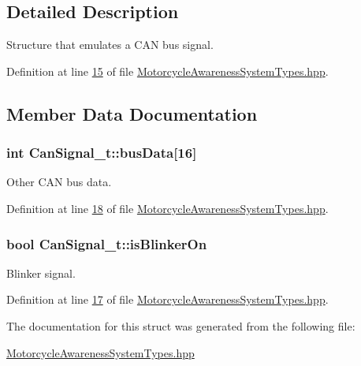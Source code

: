 \subsection{Detailed Description}
Structure that emulates a C\-A\-N bus signal. 

Definition at line \hyperlink{MotorcycleAwarenessSystemTypes_8hpp_source_l00015}{15} of file \hyperlink{MotorcycleAwarenessSystemTypes_8hpp_source}{Motorcycle\-Awareness\-System\-Types.\-hpp}.



\subsection{Member Data Documentation}
\hypertarget{structCanSignal__t_a460bece1b65aa03b07f986c71f818456}{
\subsubsection[{bus\-Data}]{\setlength{\rightskip}{0pt plus 5cm}int Can\-Signal\-\_\-t\-::bus\-Data\mbox{[}16\mbox{]}}}\label{structCanSignal__t_a460bece1b65aa03b07f986c71f818456}


Other C\-A\-N bus data. 



Definition at line \hyperlink{MotorcycleAwarenessSystemTypes_8hpp_source_l00018}{18} of file \hyperlink{MotorcycleAwarenessSystemTypes_8hpp_source}{Motorcycle\-Awareness\-System\-Types.\-hpp}.

\hypertarget{structCanSignal__t_a209edc6387534529f57c2362ec8f2586}{
\subsubsection[{is\-Blinker\-On}]{\setlength{\rightskip}{0pt plus 5cm}bool Can\-Signal\-\_\-t\-::is\-Blinker\-On}}\label{structCanSignal__t_a209edc6387534529f57c2362ec8f2586}


Blinker signal. 



Definition at line \hyperlink{MotorcycleAwarenessSystemTypes_8hpp_source_l00017}{17} of file \hyperlink{MotorcycleAwarenessSystemTypes_8hpp_source}{Motorcycle\-Awareness\-System\-Types.\-hpp}.



The documentation for this struct was generated from the following file\-:\begin{DoxyCompactItemize}
\item 
\hyperlink{MotorcycleAwarenessSystemTypes_8hpp}{Motorcycle\-Awareness\-System\-Types.\-hpp}\end{DoxyCompactItemize}
